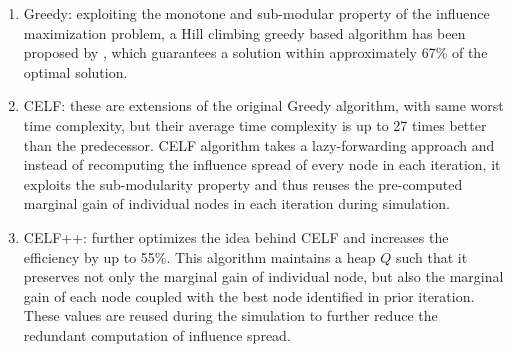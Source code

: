 		\begin{enumerate}
			\item Greedy: exploiting the monotone and sub-modular property of the influence maximization problem, a Hill climbing greedy based algorithm has been proposed by \cite{kempe2003}, which guarantees a solution within approximately 67\% of the optimal solution.
			
			\item CELF: these are extensions of the original Greedy algorithm, with same worst time complexity, but their average time complexity is up to 27 times better than the predecessor. CELF algorithm \cite{leskovec2007b} takes a lazy-forwarding approach and instead of recomputing the influence spread of every node in each iteration, it exploits the sub-modularity property and thus reuses the pre-computed marginal gain of individual nodes in each iteration during simulation.
			
			\item CELF++: \cite{goyal2011b} further optimizes the idea behind CELF and increases the efficiency by up to 55\%. This algorithm maintains a heap $Q$ such that it preserves not only the marginal gain of individual node, but also the marginal gain of each node coupled with the best node identified in prior iteration. These values are reused during the simulation to further reduce the redundant computation of influence spread.
		\end{enumerate}
		
